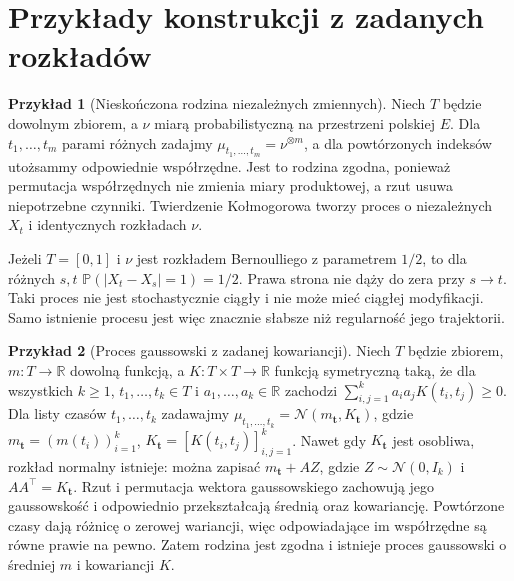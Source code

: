 \documentclass[11pt,a4paper,oneside]{report}
\numberwithin{equation}{chapter}
\theoremstyle{plain}
\theoremstyle{definition}
\newtheorem{przyklad}{Przykład}[chapter]
\theoremstyle{remark}
\newcommand{\R}{\mathbb{R}}
\newcommand{\Prob}{\mathbb{P}}
\newcommand{\Normal}{\mathcal{N}}
\begin{document}
\section{Przykłady konstrukcji z zadanych rozkładów}
\begin{przyklad}[Nieskończona rodzina niezależnych zmiennych]
Niech $T$ będzie dowolnym zbiorem, a $\nu$ miarą
probabilistyczną na przestrzeni polskiej $E$.
Dla $t_1,\ldots,t_m$ parami różnych zadajmy
$\mu_{t_1,\ldots,t_m}=\nu^{\otimes m}$,
a dla powtórzonych indeksów utożsammy odpowiednie
współrzędne. Jest to rodzina zgodna, ponieważ
permutacja współrzędnych nie zmienia miary produktowej,
a rzut usuwa niepotrzebne czynniki.
Twierdzenie Kołmogorowa tworzy proces o niezależnych
$X_t$ i identycznych rozkładach $\nu$.

Jeżeli $T=[0,1]$ i $\nu$ jest rozkładem Bernoulliego z
parametrem $1/2$, to dla różnych $s,t$
$\Prob(|X_t-X_s|=1)=1/2$. Prawa strona nie dąży do
zera przy $s\to t$. Taki proces nie jest stochastycznie
ciągły i nie może mieć ciągłej modyfikacji. Samo
istnienie procesu jest więc znacznie słabsze niż
regularność jego trajektorii.
\end{przyklad}

\begin{przyklad}[Proces gaussowski z zadanej kowariancji]
Niech $T$ będzie zbiorem, $m:T\to\R$ dowolną funkcją,
a $K:T\times T\to\R$ funkcją symetryczną taką, że
dla wszystkich $k\ge1$, $t_1,\ldots,t_k\in T$
i $a_1,\ldots,a_k\in\R$ zachodzi
$\sum_{i,j=1}^k a_ia_jK(t_i,t_j)\ge0$.
Dla listy czasów $t_1,\ldots,t_k$ zadawajmy
$\mu_{t_1,\ldots,t_k}=\Normal(m_{\mathbf t},K_{\mathbf t})$,
gdzie $m_{\mathbf t}=(m(t_i))_{i=1}^k$,
$K_{\mathbf t}=[K(t_i,t_j)]_{i,j=1}^k$.
Nawet gdy $K_{\mathbf t}$ jest osobliwa, rozkład normalny
istnieje: można zapisać $m_{\mathbf t}+AZ$, gdzie
$Z\sim\Normal(0,I_k)$ i $AA^\top=K_{\mathbf t}$.
Rzut i permutacja wektora gaussowskiego zachowują jego
gaussowskość i odpowiednio przekształcają średnią
oraz kowariancję. Powtórzone czasy dają różnicę o
zerowej wariancji, więc odpowiadające im współrzędne
są równe prawie na pewno. Zatem rodzina jest zgodna
i istnieje proces gaussowski o średniej $m$ i kowariancji $K$.
\end{przyklad}
\end{document}
